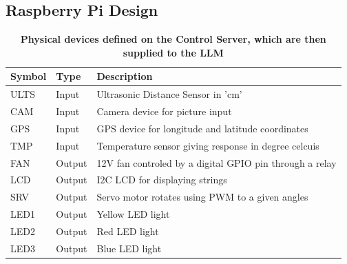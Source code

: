 \documentclass{ieeeaccess}
\begin{document}
\subsection{Raspberry Pi Design}
\begin{table}
    \caption{\textbf{Physical devices defined on the Control Server, which are then supplied to the LLM}}
    \label{table1}
    \setlength{\tabcolsep}{3pt}
    \begin{tabular}{|p{30pt}|p{25pt}|p{180pt}|}
        \hline
        \textbf{Symbol} &
        \textbf{Type}   &
        \textbf{Description}                                             \\
        \hline
        ULTS   &
        Input  &
        Ultrasonic Distance Sensor in 'cm'                      \\
        \hline
        CAM    &
        Input  &
        Camera device for picture input                         \\
        \hline
        GPS    &
        Input  &
        GPS device for longitude and latitude coordinates       \\
        \hline
        TMP    &
        Input  &
        Temperature sensor giving response in degree celcuis    \\
        \hline
        FAN    &
        Output &
        12V fan controled by a digital GPIO pin through a relay \\
        \hline
        LCD    &
        Output &
        I2C LCD for displaying strings                          \\
        \hline
        SRV    &
        Output &
        Servo motor rotates using PWM to a given angles         \\
        \hline
        LED1   &
        Output &
        Yellow LED light                                        \\
        \hline
        LED2   &
        Output &
        Red LED light                                           \\
        \hline
        LED3   &
        Output &
        Blue LED light                                          \\
        \hline
    \end{tabular}
\end{table}
\end{document}
